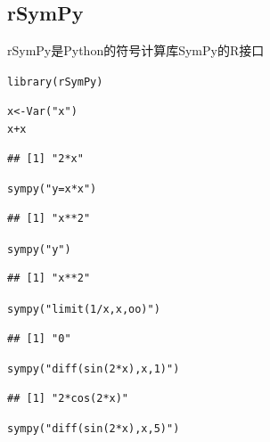 \documentclass[a4paper]{ctexart}\usepackage[]{graphicx}\usepackage[]{color}
\makeatletter
\newcommand{\hlstr}[1]{\textcolor[rgb]{1,0.4,0.2}{#1}}%
\newcommand{\hlopt}[1]{\textcolor[rgb]{0.251,0.251,0.251}{#1}}%
\newcommand{\hlstd}[1]{\textcolor[rgb]{0.251,0.251,0.251}{#1}}%
\newcommand{\hlkwb}[1]{\textcolor[rgb]{0,0.439,0.902}{#1}}%
\newcommand{\hlkwd}[1]{\textcolor[rgb]{0.69,0.188,0.941}{#1}}%
\newenvironment{kframe}{%
 \def\at@end@of@kframe{}%
 \ifinner\ifhmode%
  \def\at@end@of@kframe{\end{minipage}}%
  \begin{minipage}{\columnwidth}%
 \fi\fi%
 \def\FrameCommand##1{\hskip\@totalleftmargin \hskip-\fboxsep
 \colorbox{shadecolor}{##1}\hskip-\fboxsep
     \hskip-\linewidth \hskip-\@totalleftmargin \hskip\columnwidth}%
 \MakeFramed {\advance\hsize-\width
   \@totalleftmargin\z@ \linewidth\hsize
   \@setminipage}}%
 {\par\unskip\endMakeFramed%
 \at@end@of@kframe}
\newenvironment{knitrout}{}{} %
\makeatother
\begin{document}
\subsection{rSymPy}
rSymPy是Python的符号计算库SymPy的R接口
\begin{knitrout}
\color{fgcolor}\begin{kframe}
\begin{alltt}
\hlkwd{library}\hlstd{(rSymPy)}
\end{alltt}


{\ttfamily\noindent\itshape\color{messagecolor}{\#\# Loading required package: rJython}}

{\ttfamily\noindent\itshape\color{messagecolor}{\#\# Loading required package: rJava}}

{\ttfamily\noindent\itshape\color{messagecolor}{\#\# Loading required package: rjson}}\begin{alltt}
\hlstd{x} \hlkwb{<-} \hlkwd{Var}\hlstd{(}\hlstr{"x"}\hlstd{)}
\hlstd{x} \hlopt{+} \hlstd{x}
\end{alltt}
\begin{verbatim}
## [1] "2*x"
\end{verbatim}
\begin{alltt}
\hlkwd{sympy}\hlstd{(}\hlstr{"y = x*x"}\hlstd{)}
\end{alltt}
\begin{verbatim}
## [1] "x**2"
\end{verbatim}
\begin{alltt}
\hlkwd{sympy}\hlstd{(}\hlstr{"y"}\hlstd{)}
\end{alltt}
\begin{verbatim}
## [1] "x**2"
\end{verbatim}
\begin{alltt}
\hlkwd{sympy}\hlstd{(}\hlstr{"limit(1/x, x, oo)"}\hlstd{)}
\end{alltt}
\begin{verbatim}
## [1] "0"
\end{verbatim}
\begin{alltt}
\hlkwd{sympy}\hlstd{(}\hlstr{"diff(sin(2*x), x, 1)"}\hlstd{)}
\end{alltt}
\begin{verbatim}
## [1] "2*cos(2*x)"
\end{verbatim}
\begin{alltt}
\hlkwd{sympy}\hlstd{(}\hlstr{"diff(sin(2*x), x, 5)"}\hlstd{)}
\end{alltt}
\begin{verbatim}

\end{verbatim}
\end{kframe}
\end{knitrout}
\end{document}
